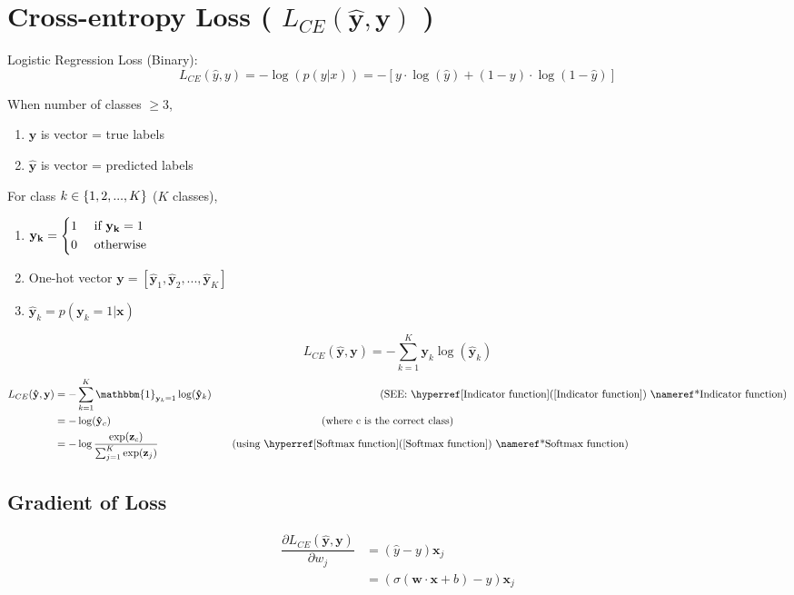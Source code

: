 \section{Cross-entropy Loss ( $L_{CE}(\hat{\mathbf{y}},\mathbf{y})$ ) \cite{nlp-1}}

Logistic Regression Loss (Binary):
\[
    L_{CE}(\hat{y}, y) = -\log(p(y|x)) = -[y\cdot\log(\hat{y})+ (1-y)\cdot\log(1-\hat{y})]
\]

When number of classes $\geq 3$,
\begin{enumerate}
    \item $\mathbf{y}$ is vector = true labels
    \item $\mathbf{\hat{y}}$ is vector = predicted labels
\end{enumerate}

\vspace{0.3cm}
For class $k \in \left\{1,2,...,K\right\}$ ($K$ classes),
\begin{enumerate}
    \item \(\mathbf{y_k} = \begin{dcases}
        1 & \text{ if } \mathbf{y_k} = 1 \\
        0 & \text{ otherwise}
    \end{dcases}\)
    \item One-hot vector $\mathbf{y} = [\mathbf{\hat{y}}_1, \mathbf{\hat{y}}_2, ..., \mathbf{\hat{y}}_K]$
    \item $\mathbf{\hat{y}}_k = p(\mathbf{y}_k = 1|\mathbf{x})$
\end{enumerate}

\vspace{0.2cm}
\[
    L_{CE}(\mathbf{\hat{y}}, \mathbf{y}) = -\sum_{k=1}^{K} \mathbf{y}_k\log(\mathbf{\hat{y}}_k)
\]
\[
\begin{aligned}
    L_{CE}(\mathbf{\hat{y}}, \mathbf{y}) &= -\sum_{k=1}^{K} \mathbbm{1}_{\mathbf{y}_k =1}\log(\mathbf{\hat{y}}_k) 
    \repeatn{16}{\quad} \text{(SEE: \fullref{Indicator function})}\\
    &= -\log(\mathbf{\hat{y}}_c) \repeatn{20}{\quad} \text{(where c is the correct class)}\\
    &= -\log\displaystyle\dfrac{\exp(\mathbf{z}_c)}{\sum_{j=1}^{K} \exp(\mathbf{z}_j)}  \repeatn{7}{\quad} \text{(using \fullref{Softmax function})}
\end{aligned}
\]


\subsection{Gradient of Loss}
\[
\begin{aligned}
    \dfrac{\partial L_{CE}(\mathbf{\hat{y}}, \mathbf{y})}{\partial w_j} &= (\hat{y} - y) \mathbf{x}_j \\
    &= (\sigma(\mathbf{w} \cdot \mathbf{x} + b) - y) \mathbf{x}_j
\end{aligned}
\]


